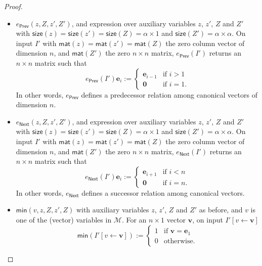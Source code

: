 \begin{proof}
\begin{itemize}
	\item $e_{\mathsf{Prev}}(z,Z,z',Z')$, and expression over auxiliary variables $z$, $z'$, $Z$ and $Z'$ with 
	$\mathsf{size}(z)=\mathsf{size}(z')=\mathsf{size}(Z)=\alpha\times 1$ and 
	$\mathsf{size}(Z')=\alpha\times\alpha$. On input $I'$ with 
	$\mathsf{mat}(z)=\mathsf{mat}(z')=\mathsf{mat}(Z)$ the zero column vector of dimension $n$, 
	and $\mathsf{mat}(Z')$ the zero $n\times n$ matrix,
	$e_{\mathsf{Prev}}(I')$ returns an $n\times n$ matrix such that 
	$$e_{\mathsf{Prev}}(I')\mathbf{e}_i:=\begin{cases} 
	\mathbf{e}_{i-1} & \text{if $i>1$}\\
	\mathbf{0} & \text{if $i=1$}.
	\end{cases}
	$$
	In other words, $e_{\mathsf{Prev}}$ defines a predecessor relation among canonical vectors of dimension $n$.
	\item $e_{\mathsf{Next}}(z,Z,z',Z')$, and expression over auxiliary variables $z$, $z'$, $Z$ and $Z'$ 
	with $\mathsf{size}(z)=\mathsf{size}(z')=\mathsf{size}(Z)=\alpha\times 1$ and 
	$\mathsf{size}(Z')=\alpha\times\alpha$. On input $I'$ with 
	$\mathsf{mat}(z)=\mathsf{mat}(z')=\mathsf{mat}(Z)$ the zero column 
	vector of dimension $n$, and $\mathsf{mat}(Z')$ the zero $n\times n$ matrix,
	$e_{\mathsf{Next}}(I')$ returns an $n\times n$ matrix such that 
	$$e_{\mathsf{Next}}(I')\mathbf{e}_i:=\begin{cases} 
	\mathbf{e}_{i+1} & \text{if $i<n$}\\
	\mathbf{0} & \text{if $i=n$}.
	\end{cases}
	$$
	In other words, $e_{\mathsf{Next}}$ defines a successor relation among canonical vectors.
	\item $\textsf{min}(v,z,Z,z',Z)$ with auxiliary variables $z$, $z'$, $Z$ and $Z'$ as before, 
	and $v$ is one of the (vector) variables in $\mathcal{M}$. For an $n\times 1$ vector $\mathbf{v}$, 
	on input $I'[v\gets \mathbf{v}]$	$$\mathsf{min}(I'[v\gets\mathbf{v}]):=\begin{cases} 1 & \text{if $\mathbf{v}=\mathbf{e}_1$}\\
		0 & \text{otherwise}.
		\end{cases}$$


\end{itemize}
\end{proof}
